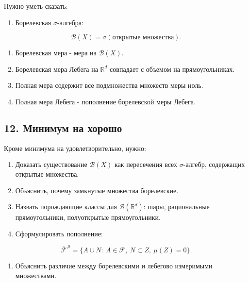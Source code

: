 \documentclass[
  11pt,
  a4paper,
]{article}
\providecommand{\tightlist}{%
  \setlength{\itemsep}{0pt}\setlength{\parskip}{0pt}}
\begin{document}
Нужно уметь сказать:

\begin{enumerate}
\def\labelenumi{\arabic{enumi}.}
\tightlist
\item
  Борелевская \(\sigma\)-алгебра:
\end{enumerate}

\[
\mathcal B(X)=\sigma(\text{открытые множества}).
\]

\begin{enumerate}
\def\labelenumi{\arabic{enumi}.}
\setcounter{enumi}{1}
\tightlist
\item
  Борелевская мера - мера на \(\mathcal B(X)\).
\item
  Борелевская мера Лебега на \(\mathbb R^d\) совпадает с объемом на
  прямоугольниках.
\item
  Полная мера содержит все подмножества множеств меры ноль.
\item
  Полная мера Лебега - пополнение борелевской меры Лебега.
\end{enumerate}

\subsection{12. Минимум на
хорошо}\label{ux43cux438ux43dux438ux43cux443ux43c-ux43dux430-ux445ux43eux440ux43eux448ux43e}

Кроме минимума на удовлетворительно, нужно:

\begin{enumerate}
\def\labelenumi{\arabic{enumi}.}
\tightlist
\item
  Доказать существование \(\mathcal B(X)\) как пересечения всех
  \(\sigma\)-алгебр, содержащих открытые множества.
\item
  Объяснить, почему замкнутые множества борелевские.
\item
  Назвать порождающие классы для \(\mathcal B(\mathbb R^d)\): шары,
  рациональные прямоугольники, полуоткрытые прямоугольники.
\item
  Сформулировать пополнение:
\end{enumerate}

\[
\overline{\mathcal F}^{\,\mu}
=
\{A\cup N:\ A\in\mathcal F,\ N\subset Z,\ \mu(Z)=0\}.
\]

\begin{enumerate}
\def\labelenumi{\arabic{enumi}.}
\setcounter{enumi}{4}
\tightlist
\item
  Объяснить различие между борелевскими и лебегово измеримыми
  множествами.
\end{enumerate}
\end{document}
